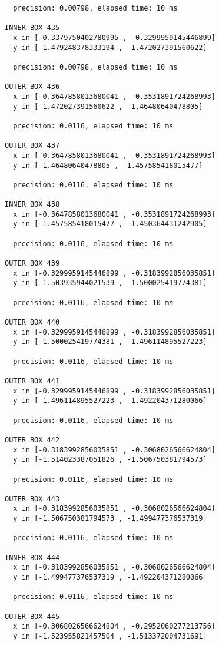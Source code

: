 \begin{verbatim}
  precision: 0.00798, elapsed time: 10 ms

INNER BOX 435
  x in [-0.3379750402780995 , -0.3299959145446899]
  y in [-1.479248378333194 , -1.472027391560622]

  precision: 0.00798, elapsed time: 10 ms

OUTER BOX 436
  x in [-0.3647858013680041 , -0.3531891724268993]
  y in [-1.472027391560622 , -1.46480640478805]

  precision: 0.0116, elapsed time: 10 ms

OUTER BOX 437
  x in [-0.3647858013680041 , -0.3531891724268993]
  y in [-1.46480640478805 , -1.457585418015477]

  precision: 0.0116, elapsed time: 10 ms

INNER BOX 438
  x in [-0.3647858013680041 , -0.3531891724268993]
  y in [-1.457585418015477 , -1.450364431242905]

  precision: 0.0116, elapsed time: 10 ms

OUTER BOX 439
  x in [-0.3299959145446899 , -0.3183992856035851]
  y in [-1.503935944021539 , -1.500025419774381]

  precision: 0.0116, elapsed time: 10 ms

OUTER BOX 440
  x in [-0.3299959145446899 , -0.3183992856035851]
  y in [-1.500025419774381 , -1.496114895527223]

  precision: 0.0116, elapsed time: 10 ms

OUTER BOX 441
  x in [-0.3299959145446899 , -0.3183992856035851]
  y in [-1.496114895527223 , -1.492204371280066]

  precision: 0.0116, elapsed time: 10 ms

OUTER BOX 442
  x in [-0.3183992856035851 , -0.3068026566624804]
  y in [-1.514023387051826 , -1.506750381794573]

  precision: 0.0116, elapsed time: 10 ms

OUTER BOX 443
  x in [-0.3183992856035851 , -0.3068026566624804]
  y in [-1.506750381794573 , -1.499477376537319]

  precision: 0.0116, elapsed time: 10 ms

INNER BOX 444
  x in [-0.3183992856035851 , -0.3068026566624804]
  y in [-1.499477376537319 , -1.492204371280066]

  precision: 0.0116, elapsed time: 10 ms

OUTER BOX 445
  x in [-0.3068026566624804 , -0.2952060277213756]
  y in [-1.523955821457504 , -1.513372004731691]


\end{verbatim}
